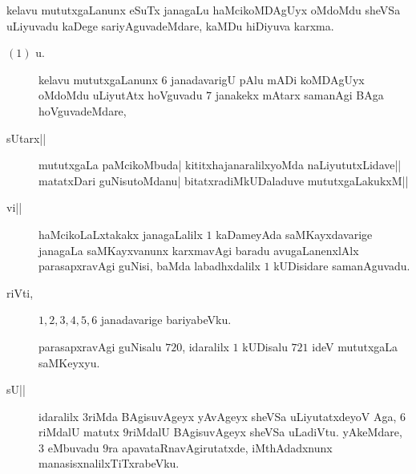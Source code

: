 

kelavu mututxgaLanunx eSuTx janagaLu haMcikoMDAgUyx oMdoMdu sheVSa
uLiyuvadu kaDege sariyAguvadeMdare, kaMDu hiDiyuva karxma.

\begin{description}
\item[$(1)$ u.] kelavu mututxgaLanunx $6$ janadavarigU pAlu mADi
  koMDAgUyx oMdoMdu uLiyutAtx hoVguvadu $7$ janakekx mAtarx samanAgi
  BAga hoVguvadeMdare,

\item[sUtarx||] mututxgaLa paMcikoMbuda| kititxhajanaralilxyoMda
  naLiyututxLidave|| matatxDari guNisutoMdanu| bitatxradiM\-kUDaladuve
  mututxgaLakukxM||

\item[vi||] haMcikoLaLxtakakx janagaLalilx $1$ kaDameyAda
  saMKayxdavarige janagaLa saMKayxvanunx karxmavAgi baradu
  avugaLanenxlAlx parasapxravAgi guNisi, baMda labadhxdalilx $1$
  kUDisidare samanAguvadu.

\item[riVti,] $1, 2, 3, 4, 5, 6$ janadavarige bariyabeVku.

  parasapxravAgi guNisalu $720$, idaralilx $1$ kUDisalu $721$ ideV
  mututxgaLa saMKeyxyu.

\item[sU||] idaralilx $3$riMda BAgisuvAgeyx yAvAgeyx sheVSa
  uLiyutatxdeyoV Aga, $6$riMdalU matutx $9$riMdalU BAgi\-suvAgeyx sheVSa
  uLadiVtu. yAkeMdare, $3$ eMbuvadu $9$ra apavataRnavAgirutatxde,
  iMthAdadxnunx manasisxnalilxTiTxrabeVku.
\end{description}
